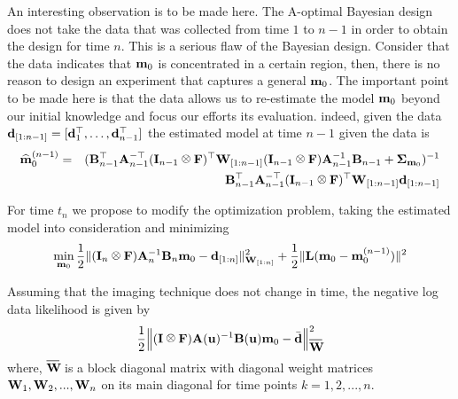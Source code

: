 \documentclass[12pt]{article}
\newcommand{\bfA}	{{\bf{A}}}
\newcommand{\bfB}	{{\bf{B}}}
\newcommand{\bfF}	{{\bf{F}}}
\newcommand{\bfI}	{{\bf{I}}}
\newcommand{\bfL}	{{\bf{L}}}
\newcommand{\bfW}	{{\bf{W}}}
\newcommand{\bfd}	{{\bf{d}}}
\newcommand{\bfm}	{{\bf{m}}}
\newcommand{\bfu}	{{\bf{u}}}
\newcommand{\hf}        {{\frac 12}}
\newcommand{\bfSigma}   {{\boldsymbol \Sigma}}
\renewcommand{\hf}		 {\frac12}
\newcommand*\xbar[1]{%
  \hbox{%
    \vbox{%
      \hrule height 0.5pt %
      \kern0.5ex%
      \hbox{%
        \kern-0.em%
        \ensuremath{#1}%
        \kern-0.15em%
      }%
    }%
  }%
}
\def\kronecker{\raisebox{1pt}{\ensuremath{\:\otimes\:}}}
\begin{document}
\bigskip

An interesting observation is to be made here. The A-optimal Bayesian design does not take the data that
was  collected from time $1$ to $n-1$ in order to obtain the design for time $n$. This is a serious flaw of the Bayesian design. Consider that the data indicates that $\bfm_{0}$ is concentrated in a certain region, then, there is no reason
to design an experiment that captures a general $\bfm_{0}$. The important point to be made here is that the data
allows us to re-estimate the model $\bfm_{0}$ beyond our initial knowledge and focus our efforts its evaluation. indeed, given the data $\bfd_{[1:n-1]} =
[\bfd_{1}^{\top},\ldots,\bfd_{n-1}^{\top}]$
the estimated  model at time $n-1$ given the data is
\begin{eqnarray}
\label{modelmean}
 \widehat \bfm_{0}^{(n-1)} &=& 
(\bfB_{n-1}^{\top}\bfA_{n-1}^{-\top} (\bfI_{n-1} \kronecker \bfF)^{\top} \bfW_{[1:n-1]} (\bfI_{n-1} \kronecker \bfF) \bfA_{n-1}^{-1} \bfB_{n-1} + \bfSigma_{\bfm_{0}})^{-1} \\
 \nonumber
&& \bfB_{n-1}^{\top}\bfA_{n-1}^{-\top} (\bfI_{n-1} \kronecker \bfF)^{\top} \bfW_{[1:n-1]} \bfd_{[1:n-1]}
\end{eqnarray}

For time $t_{n}$ we propose to modify the optimization problem, taking the estimated model into consideration
and minimizing
\begin{eqnarray}
\label{minn}
\min_{\bfm_{0}} 
\hf \|(\bfI_{n} \kronecker \bfF) \bfA_{n}^{-1} \bfB_{n} \bfm_{0} - \bfd_{[1:n]} \|_{\bfW_{[1:n]}}^{2}
+ \hf \| \bfL( \bfm_{0} -  \bfm_{0}^{(n-1)}) \|^{2}
\end{eqnarray}








\newpage

Assuming that the imaging technique does not change in time, the  negative log data likelihood is given by
\begin{equation}
\hf \Big\|(\bfI \kronecker \bfF) \bfA(\bfu)^{-1} \bfB(\bfu) \bfm_0- \bar{\bfd} \Big\|^2_{ \xbar{\bfW}} 
\end{equation}
where, $\xbar{\bfW}$ is a block diagonal matrix with diagonal weight matrices $\bfW_1,\bfW_2,...,\bfW_n$ on its main diagonal for  time points $ k = 1,2,...,n$.
\end{document}
